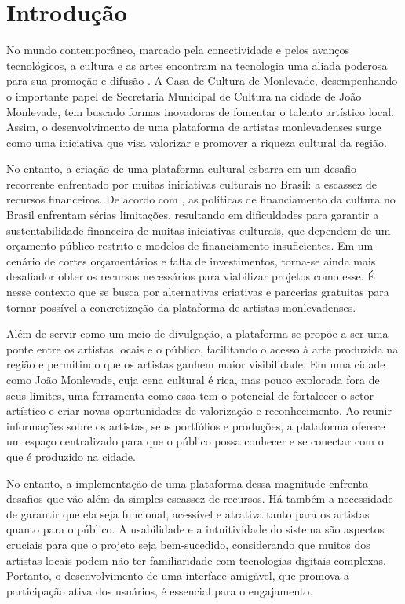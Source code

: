 \chapter{Introdução}
\label{cap:introducao}

No mundo contemporâneo, marcado pela conectividade e pelos avanços tecnológicos, a cultura e as artes encontram na tecnologia uma aliada poderosa para sua promoção e difusão \cite{gasparetto2014arte}. A Casa de Cultura de Monlevade, desempenhando o importante papel de Secretaria Municipal de Cultura na cidade de João Monlevade, tem buscado formas inovadoras de fomentar o talento artístico local. Assim, o desenvolvimento de uma plataforma de artistas monlevadenses surge como uma iniciativa que visa valorizar e promover a riqueza cultural da região.

No entanto, a criação de uma plataforma cultural esbarra em um desafio recorrente enfrentado por muitas iniciativas culturais no Brasil: a escassez de recursos financeiros. De acordo com , as políticas de financiamento da cultura no Brasil enfrentam sérias limitações, resultando em dificuldades para garantir a sustentabilidade financeira de muitas iniciativas culturais, que dependem de um orçamento público restrito e modelos de financiamento insuficientes. Em um cenário de cortes orçamentários e falta de investimentos, torna-se ainda mais desafiador obter os recursos necessários para viabilizar projetos como esse. É nesse contexto que se busca por alternativas criativas e parcerias gratuitas para tornar possível a concretização da plataforma de artistas monlevadenses.

Além de servir como um meio de divulgação, a plataforma se propõe a ser uma ponte entre os artistas locais e o público, facilitando o acesso à arte produzida na região e permitindo que os artistas ganhem maior visibilidade. Em uma cidade como João Monlevade, cuja cena cultural é rica, mas pouco explorada fora de seus limites, uma ferramenta como essa tem o potencial de fortalecer o setor artístico e criar novas oportunidades de valorização e reconhecimento. Ao reunir informações sobre os artistas, seus portfólios e produções, a plataforma oferece um espaço centralizado para que o público possa conhecer e se conectar com o que é produzido na cidade.

No entanto, a implementação de uma plataforma dessa magnitude enfrenta desafios que vão além da simples escassez de recursos. Há também a necessidade de garantir que ela seja funcional, acessível e atrativa tanto para os artistas quanto para o público. A usabilidade e a intuitividade do sistema são aspectos cruciais para que o projeto seja bem-sucedido, considerando que muitos dos artistas locais podem não ter familiaridade com tecnologias digitais complexas. Portanto, o desenvolvimento de uma interface amigável, que promova a participação ativa dos usuários, é essencial para o engajamento.

